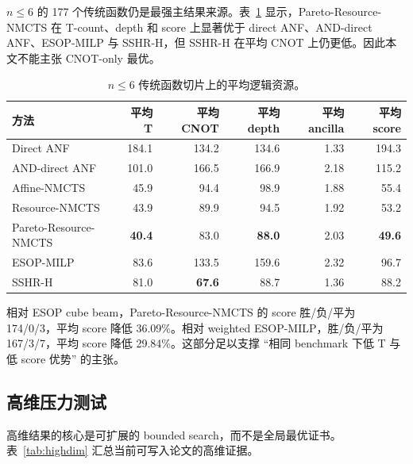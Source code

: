 \documentclass[UTF8,fontset=macnew,11pt]{ctexart}
\newcommand{\method}{Resource-NMCTS}
\newcommand{\pareto}{Pareto-Resource-NMCTS}
\begin{document}
$n\leq6$ 的 177 个传统函数仍是最强主结果来源。表~\ref{tab:traditional} 显示，\pareto{} 在 T-count、depth 和 score 上显著优于 direct ANF、AND-direct ANF、ESOP-MILP 与 SSHR-H，但 SSHR-H 在平均 CNOT 上仍更低。因此本文不能主张 CNOT-only 最优。

\begin{table}[t]
\centering
\small
\caption{$n\leq6$ 传统函数切片上的平均逻辑资源。}
\label{tab:traditional}
\begin{tabular}{lrrrrr}
\toprule
方法 & 平均 T & 平均 CNOT & 平均 depth & 平均 ancilla & 平均 score \\
\midrule
Direct ANF & 184.1 & 134.2 & 134.6 & 1.33 & 194.3 \\
AND-direct ANF & 101.0 & 166.5 & 166.9 & 2.18 & 115.2 \\
Affine-NMCTS & 45.9 & 94.4 & 98.9 & 1.88 & 55.4 \\
\method{} & 43.9 & 89.9 & 94.5 & 1.92 & 53.2 \\
\pareto{} & \textbf{40.4} & 83.0 & \textbf{88.0} & 2.03 & \textbf{49.6} \\
ESOP-MILP & 83.6 & 133.5 & 159.6 & 2.32 & 96.7 \\
SSHR-H & 81.0 & \textbf{67.6} & 88.7 & 1.36 & 88.2 \\
\bottomrule
\end{tabular}
\end{table}

相对 ESOP cube beam，\pareto{} 的 score 胜/负/平为 174/0/3，平均 score 降低 36.09\%。相对 weighted ESOP-MILP，胜/负/平为 167/3/7，平均 score 降低 29.84\%。这部分足以支撑 ``相同 benchmark 下低 T 与低 score 优势'' 的主张。

\subsection{高维压力测试}

高维结果的核心是可扩展的 bounded search，而不是全局最优证书。表~\ref{tab:highdim} 汇总当前可写入论文的高维证据。
\end{document}

